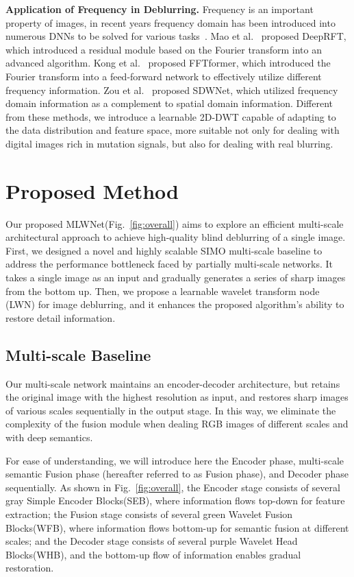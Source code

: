 \documentclass[10pt,twocolumn,letterpaper]{article}
\begin{document}
\noindent\textbf{Application of Frequency in Deblurring.}
Frequency is an important property of images, in recent years frequency domain has been introduced into numerous DNNs to be solved for various tasks~\cite{suvorov2022resolution,wang2022image,zhong2022detecting,kong2023efficient,yang2020fda,qin2021fcanet}. Mao et al.~\cite{mao2021deep} proposed DeepRFT, which introduced a residual module based on the Fourier transform into an advanced algorithm. Kong et al.~\cite{kong2023efficient} proposed FFTformer, which introduced the Fourier transform into a feed-forward network to effectively utilize different frequency information. Zou et al.~\cite{zou2021sdwnet} proposed SDWNet, which utilized frequency domain information as a complement to spatial domain information. Different from these methods, we introduce a learnable 2D-DWT capable of adapting to the data distribution and feature space, more suitable not only for dealing with digital images rich in mutation signals, but also for dealing with real blurring.
\section{Proposed Method}
Our proposed MLWNet(Fig.~\ref{fig:overall}) aims to explore an efficient multi-scale architectural approach to achieve high-quality blind deblurring of a single image. First, we designed a novel and highly scalable SIMO multi-scale baseline to address the performance bottleneck faced by partially multi-scale networks. It takes a single image as an input and gradually generates a series of sharp images from the bottom up. Then, we propose a learnable wavelet transform node (LWN) for image deblurring, and it enhances the proposed algorithm’s ability to restore detail information.

\subsection{Multi-scale Baseline}
\label{baseline}
Our multi-scale network maintains an encoder-decoder architecture, but retains the original image with the highest resolution as input, and restores sharp images of various scales sequentially in the output stage. In this way, we eliminate the complexity of the fusion module when dealing RGB images of different scales and with deep semantics. 

For ease of understanding, we will introduce here the Encoder phase, multi-scale semantic Fusion phase (hereafter referred to as Fusion phase), and Decoder phase sequentially. 
As shown in Fig.~\ref{fig:overall}, the Encoder stage consists of several gray Simple Encoder Blocks(SEB), where information flows top-down for feature extraction; 
the Fusion stage consists of several green Wavelet Fusion Blocks(WFB), where information flows bottom-up for semantic fusion at different scales; 
and the Decoder stage consists of several purple Wavelet Head Blocks(WHB), and the bottom-up flow of information enables gradual restoration.
\end{document}
